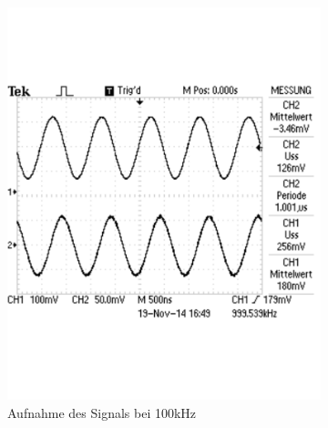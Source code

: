 \documentclass[12pt,a4paper]{article}
\begin{document}
\begin{figure}[H]
\begin{subfigure}[b]{0.28\textwidth}
                \includegraphics[width=\textwidth , scale = 0.4]{2_4_100_100k.pdf}
                \caption[Aufnahme des Signals bei 100kHz]{Aufnahme des Signals bei 100kHz}
                \label{fig:2_4_100_100k}
        \end{subfigure}
        \hfill
        \begin{subfigure}[b]{0.28\textwidth}

\end{subfigure}
\end{figure}
\end{document}
